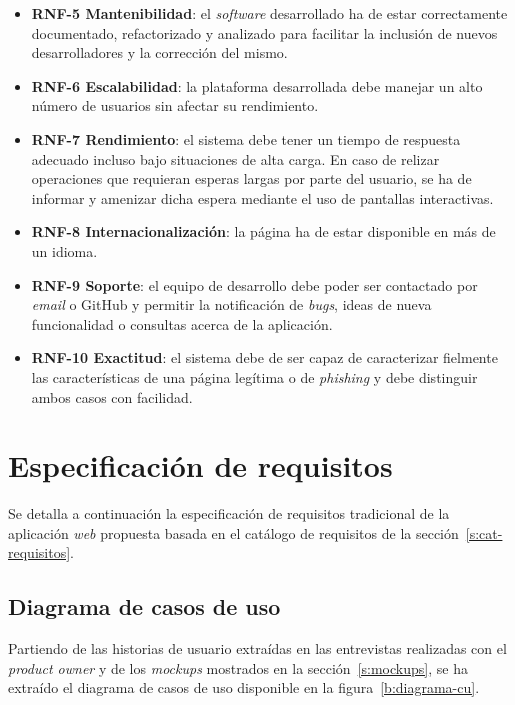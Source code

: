 \begin{itemize}
	\item \textbf{RNF-5 Mantenibilidad}: el \textit{software} desarrollado ha de estar correctamente documentado, refactorizado y analizado para facilitar la inclusión de nuevos desarrolladores y la corrección del mismo.
	\item \textbf{RNF-6 Escalabilidad}: la plataforma desarrollada debe manejar un alto número de usuarios sin afectar su rendimiento.
	\item \textbf{RNF-7 Rendimiento}: el sistema debe tener un tiempo de respuesta adecuado incluso bajo situaciones de alta carga. En caso de relizar operaciones que requieran esperas largas por parte del usuario, se ha de informar y amenizar dicha espera mediante el uso de pantallas interactivas.
	\item \textbf{RNF-8 Internacionalización}: la página ha de estar disponible en más de un idioma.
	\item \textbf{RNF-9 Soporte}: el equipo de desarrollo debe poder ser contactado por \textit{email} o GitHub y permitir la notificación de \textit{bugs}, ideas de nueva funcionalidad o consultas acerca de la aplicación.
	\item \textbf{RNF-10 Exactitud}: el sistema debe de ser capaz de caracterizar fielmente las características de una página legítima o de \textit{phishing} y debe distinguir ambos casos con facilidad.
\end{itemize}

\section{Especificación de requisitos}
\label{s:requisitos}

Se detalla a continuación la especificación de requisitos tradicional de la aplicación \textit{web} propuesta basada en el catálogo de requisitos de la sección~\ref{s:cat-requisitos}.

\subsection{Diagrama de casos de uso}
\label{ss:diagrama-casos-uso}

Partiendo de las historias de usuario extraídas en las entrevistas realizadas con el \textit{product owner} y de los \textit{mockups} mostrados en la sección~\ref{s:mockups}, se ha extraído el diagrama de casos de uso disponible en la figura~\ref{b:diagrama-cu}.

